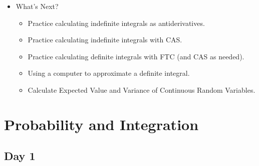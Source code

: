 \documentclass[letterpaper,oneside]{book}%
\theoremstyle{plain}
\theoremstyle{box}
\theoremstyle{problem}
\begin{document}
\begin{itemize}
\begin{itemize}
\begin{itemize}
\end{itemize}
\item Day 3 -- Finding Inconvenient Areas (Focus: Riemann Sums and definition of the definite integral. A definite integral can be used to find area.)
\item Day 4 -- Making Connections: The Fundamental Theorem.\\
Back to the ``Rectangle Map". Start with an inconveniently shaped rug function. Find the total area. Calculate the Normalize Rug fuction. Find an antiderivative (NOT an indefinite integral -- we have not made this connection yet). Use the properties of probability distribution to determine the specific antiderivative that is the CDF. Introduce the notation for an accumulation function. Let technology evaluate the accumulation function to verify that going counter-clockwise around the rectangle does indeed produce the CDF.\\
``We have just observed something fundamental? What shall we call it? -- Let's call it The Fundamental Theorem like the rest of the mathematics community."
Continue to reinforce the FTC and the connection between derivatives and antiderivatives, antiderivatives and indefinite integrals, and definite integrals and indefinite integrals as we gain experience with each of these mathematical objects.
\end{itemize}
\item What's Next?
\begin{itemize}
\item Practice calculating indefinite integrals as antiderivatives.
\item Practice calculating indefinite integrals with CAS.
\item Practice calculating definite integrals with FTC (and CAS as needed).
\item Using a computer to approximate a definite integral.
\item Calculate Expected Value and Variance of Continuous Random Variables.
\end{itemize}
\end{itemize}


\chapter{Probability and Integration}
\section{Day 1}
\end{document}
